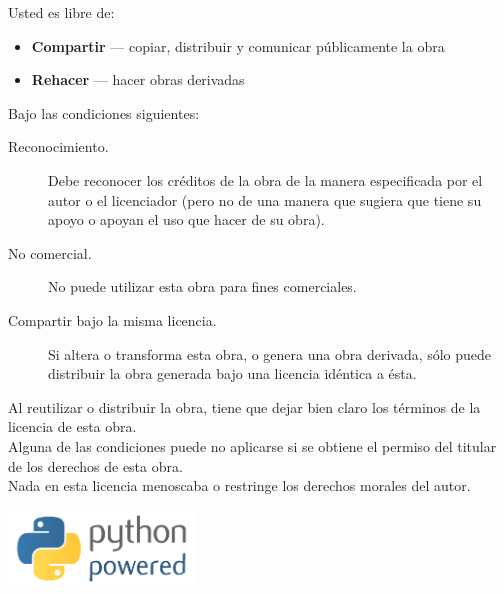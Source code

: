 \noindent
Usted es libre de:
\begin{itemize}
 \item \textbf{Compartir} — copiar, distribuir y comunicar públicamente la obra 
 \item \textbf{Rehacer} — hacer obras derivadas
\end{itemize}
\noindent
Bajo las condiciones siguientes:
\begin{description}
 \item[Reconocimiento.] Debe reconocer los créditos de la obra de la manera especificada por el autor o el licenciador (pero no de una manera que sugiera que tiene su apoyo o apoyan el uso que hacer de su obra).
 \item[No comercial.] No puede utilizar esta obra para fines comerciales.
 \item[Compartir bajo la misma licencia.] Si altera o transforma esta obra, o genera una obra derivada, sólo puede distribuir la obra generada bajo una licencia idéntica a ésta. 
\end{description}

\noindent
Al reutilizar o distribuir la obra, tiene que dejar bien claro los términos de la licencia de esta obra.\\

\noindent
Alguna de las condiciones puede no aplicarse si se obtiene el permiso del titular de los derechos de esta obra.\\

\noindent
Nada en esta licencia menoscaba o restringe los derechos morales del autor.\\

\vspace*{4cm}
\begin{center}
\includegraphics[width=5cm]{python-powered.png}
\end{center}

\mainmatter

\pagestyle{plain}

